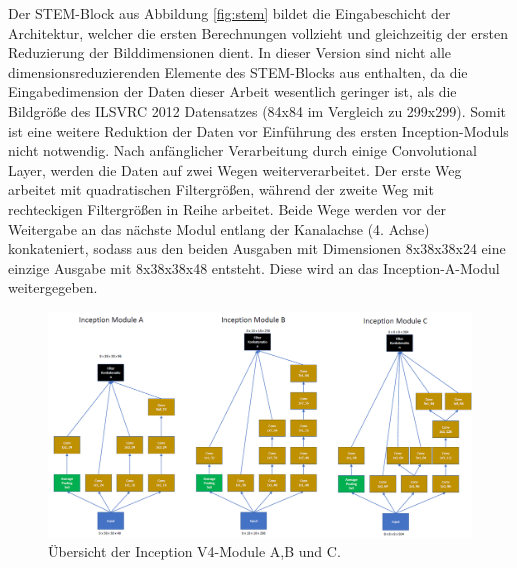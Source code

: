 Der STEM-Block aus Abbildung \ref{fig:stem} bildet die Eingabeschicht der Architektur, welcher die ersten Berechnungen vollzieht und gleichzeitig der ersten Reduzierung der Bilddimensionen dient. In dieser Version sind nicht alle dimensionsreduzierenden Elemente des STEM-Blocks aus \textcite{DBLP:journals/corr/SzegedyIV16} enthalten, da die Eingabedimension der Daten dieser Arbeit wesentlich geringer ist, als die Bildgröße des ILSVRC 2012 Datensatzes (84x84 im Vergleich zu 299x299). Somit ist eine weitere Reduktion der Daten vor Einführung des ersten Inception-Moduls nicht notwendig. Nach anfänglicher Verarbeitung durch einige Convolutional Layer, werden die Daten auf zwei Wegen weiterverarbeitet. Der erste Weg arbeitet mit quadratischen Filtergrößen, während der zweite Weg mit rechteckigen Filtergrößen in Reihe arbeitet. Beide Wege werden vor der Weitergabe an das nächste Modul entlang der Kanalachse (4. Achse) konkateniert, sodass aus den beiden Ausgaben mit Dimensionen 8x38x38x24 eine einzige Ausgabe mit 8x38x38x48 entsteht. Diese wird an das Inception-A-Modul weitergegeben. 

\begin{figure}[H]
\centering
\includegraphics[scale=0.4]{pictures/Inception/InceptionABC}
\caption[Caption for LOF]{Übersicht der Inception V4-Module A,B und C.}
\label{fig:incmod}
\end{figure}

